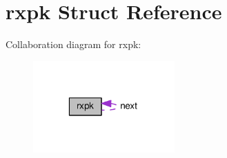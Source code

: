 \hypertarget{structrxpk}{\section{rxpk Struct Reference}
\label{structrxpk}
}


Collaboration diagram for rxpk\-:\nopagebreak
\begin{figure}[H]
\begin{center}
\leavevmode
\includegraphics[width=154pt]{structrxpk__coll__graph}
\end{center}
\end{figure}
